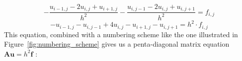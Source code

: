 \begin{equation}
  \nonumber
  - \frac{u_{i-1,j} - 2u_{i,j} + u_{i+1,j}}{h^2} - \frac{u_{i,j-1} - 2u_{i,j} + u_{i,j+1}}{h^2} = f_{i,j}
\end{equation}
\begin{equation}
  -u_{i-1,j} -u_{i,j-1} + 4u_{i,j} - u_{i+1,j} - u_{i,j+1} = h^2 \cdot f_{i,j}
\end{equation}
This equation, combined with a numbering scheme like the one illustrated in Figure~\ref{fig:numbering_scheme} gives us a penta-diagonal matrix equation $\mathbf{Au}=h^2\mathbf{f}$ :

